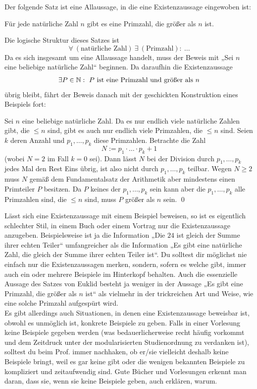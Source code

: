   
  
Der folgende Satz ist eine Allaussage, in die eine Existenzaussage eingewoben ist:

  \begin{bsp} \label{euklid}
   Für jede natürliche Zahl $n$ gibt es eine Primzahl, die größer als $n$ ist.
  \end{bsp}
  \begin{bem}
  Die logische Struktur dieses Satzes ist
  \[ \forall\ (\text{natürliche Zahl})\ \exists\ (\text{Primzahl}):\ \dots \]
  Da es sich insgesamt um eine Allaussage handelt, muss der Beweis mit „Sei $n$ eine beliebige natürliche Zahl“ beginnen. Da daraufhin die Existenzaussage
  \[ \exists P\in \Nz:\ \text{$P$ ist eine Primzahl und größer als $n$} \]
  übrig bleibt, fährt der Beweis danach mit der geschickten Konstruktion eines Beispiels fort:
  \end{bem}
\begin{bew}
 Sei $n$ eine beliebige natürliche Zahl. Da es nur endlich viele natürliche Zahlen gibt, die $\leq n$ sind, gibt es auch nur endlich viele Primzahlen, die $\leq n$ sind. Seien $k$ deren Anzahl und $p_1,\dots , p_k$ diese Primzahlen. Betrachte die Zahl
 \[ N := p_1\cdot\ldots\cdot p_k + 1 \]
 (wobei $N=2$ im Fall $k=0$ sei). Dann lässt $N$ bei der Division durch $p_1,\dots , p_k$ jedes Mal den Rest Eins übrig, ist also nicht durch $p_1,\dots , p_k$ teilbar. Wegen $N\geq 2$ muss $N$ gemäß dem Fundamentalsatz der Arithmetik aber mindestens einen Primteiler $P$ besitzen. Da $P$ keines der $p_1,\dots ,p_k$ sein kann aber die $p_1,\dots , p_k$ alle Primzahlen sind, die $\leq n$ sind, muss $P$ größer als $n$ sein. \qed
\end{bew}

  
  \begin{bem}
   Lässt sich eine Existenzaussage mit einem Beispiel beweisen, so ist es eigentlich schlechter Stil, in einem Buch oder einem Vortrag nur die Existenzaussage anzugeben. Beispielsweise ist ja die Information „Die $24$ ist gleich der Summe ihrer echten Teiler“ umfangreicher als die Information „Es gibt eine natürliche Zahl, die gleich der Summe ihrer echten Teiler ist“. Du solltest dir möglichst nie einfach nur die Existenzaussagen merken, sondern, sofern es welche gibt, immer auch ein oder mehrere Beispiele im Hinterkopf behalten. Auch die essenzielle Aussage des Satzes von Euklid besteht ja weniger in der Aussage „Es gibt eine Primzahl, die größer als $n$ ist“ als vielmehr in der trickreichen Art und Weise, wie eine solche Primzahl aufgespürt wird. \\
   Es gibt allerdings auch Situationen, in denen eine Existenzaussage beweisbar ist, obwohl es unmöglich ist, konkrete Beispiele zu geben. Falls in einer Vorlesung keine Beispiele gegeben werden (was bedauerlicherweise recht häufig vorkommt und dem Zeitdruck unter der modularisierten Studienordnung zu verdanken ist), solltest du beim Prof. immer nachhaken, ob er/sie vielleicht deshalb keine Beispiele bringt, weil es gar keine gibt oder die wenigen bekannten Beispiele zu kompliziert und zeitaufwendig sind. Gute Bücher und Vorlesungen erkennt man daran, dass sie, wenn sie keine Beispiele geben, auch erklären, warum.
  \end{bem}

